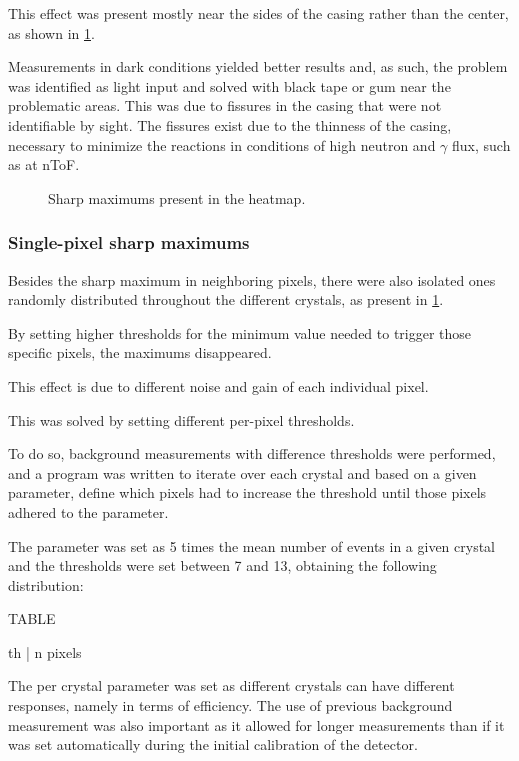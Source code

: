 This effect was present mostly near the sides of the casing rather than the center, as shown in \ref{fig:LightHeatmap}.

Measurements in dark conditions yielded better results and, as such, the problem was identified as light input and solved with black tape or gum near the problematic areas. This was due to fissures in the casing that were not identifiable by sight. The fissures exist due to the thinness of the casing, necessary to minimize the reactions in conditions of high neutron and $\gamma$ flux, such as at \ac{nToF}.

\begin{figure}[h!]
    \centering
    \qquad
    \caption{Sharp maximums present in the heatmap.}%
    \label{fig:LightHeatmap}
\end{figure}

\subsubsection{Single-pixel sharp maximums}

Besides the sharp maximum in neighboring pixels, there were also isolated ones randomly distributed throughout the different crystals, as present in \ref{fig:LightHeatmap}.

By setting higher thresholds for the minimum value needed to trigger those specific pixels, the maximums disappeared.

This effect is due to different noise and gain of each individual pixel.

This was solved by setting different per-pixel thresholds.

To do so, background measurements with difference thresholds were performed, and a program was written to iterate over each crystal and based on a given parameter, define which pixels had to increase the threshold until those pixels adhered to the parameter.

The parameter was set as 5 times the mean number of events in a given crystal and the thresholds were set between 7 and 13, obtaining the following distribution:

TABLE

th | n pixels

The per crystal parameter was set as different crystals can have different responses, namely in terms of efficiency. The use of previous background measurement was also important as it allowed for longer measurements than if it was set automatically during the initial calibration of the detector.

